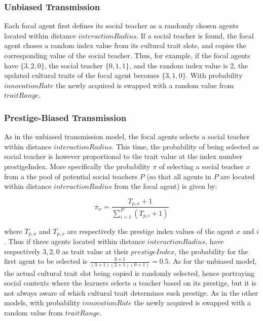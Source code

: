 \documentclass[11pt,a4paper,twocolumn,notitlepage]{article}
\begin{document}
\subsubsection{Unbiased Transmission}

Each focal agent first defines its social teacher as a randomly chosen agents located within distance $interactionRadius$. If a social teacher is found, the focal agent choses a random index value from its cultural trait slots, and copies the corresponding value of the social teacher. Thus, for example, if the focal agents have $\{3,2,0\}$,  the social teacher $\{0,1,1\}$, and the random index value is $2$, the updated cultural traits of the focal agent becomes $\{3,1,0\}$. With probability $innovationRate$ the newly acquired is swapped with a random value from $traitRange$.

\subsubsection{Prestige-Biased Transmission}

As in the unbiased transmission model, the focal agents selects a social teacher within distance $interactionRadius$. This time, the probability of being selected as social teacher is however proportional to the trait value at the index number prestigeIndex. More specifically the probability $\pi$ of selecting a social teacher $x$ from a the pool of potential social teachers $P$ (so that all agents in $P$ are located within distance $interactionRadius$ from the focal agent) is given by:

\begin{equation}
 \pi_x = \frac{T_{p,x}+1}{\sum\limits_{i=1}^{P}{(T_{p,i}+1)}} 
\end{equation}

where $T_{p,x}$ and $T_{p,x}$ are respectively the prestige index values of the agent $x$ and $i$. Thus if three agents located within distance $interactionRadius$, have respectively ${3,2,0}$ as trait value at their $prestigeIndex$, the probability for the first agent to be selected is $ \frac{3+1}{(3+1)(2+1)(0+1)} = 0.5$. As for the unbiased model, the actual cultural trait slot being copied is randomly selected, hence portraying social contexts where the learners selects a teacher based on its prestige, but it is not always aware of which cultural trait determines such prestige.  As in the other models, with probability $innovationRate$ the newly acquired is swapped with a random value from $traitRange$.
\end{document}
